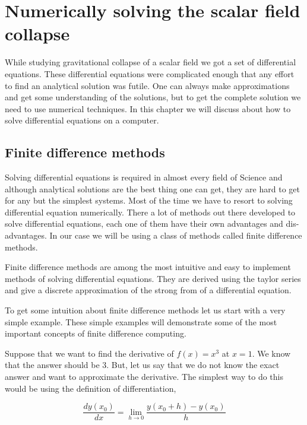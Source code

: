 \chapter{Numerically solving the scalar field collapse}

While studying gravitational collapse of a scalar field we got a set of differential equations. These differential equations were complicated enough that any effort to find an analytical solution was futile. One can always make approximations and get some understanding of the solutions, but to get the complete solution we need to use numerical techniques. In this chapter we will discuss about how to solve differential equations on a computer.




\section{Finite difference methods}

Solving differential equations is required in almost every field of Science and although analytical solutions are the best thing one can get, they are hard to get for any but the simplest systems.
Most of the time we have to resort to solving differential equation numerically. There a lot of methods out there developed to solve differential equations, each one of them have their own advantages and dis-advantages. In our case we will be using a class of methods called finite difference methods.

 Finite difference methods are among the most intuitive and easy to implement methods of solving differential equations. They are derived using the taylor series and give a discrete approximation of the strong from of a differential equation.

To get some intuition about finite difference methods let us start with a very simple example. These simple examples will demonstrate some of the most important concepts of finite difference computing.

Suppose that we want to find the derivative of $f(x) = x^3$ at $x =1$. We know that the answer should be $3$. But, let us say that we do not know the exact answer and want to approximate the derivative.
The simplest way to do this would be using the definition of differentiation,

\begin{equation}
    \frac{dy(x_0)}{dx} = \lim_{h \to 0}\frac{y(x_0 + h) - y(x_0)}{h}
\end{equation}

